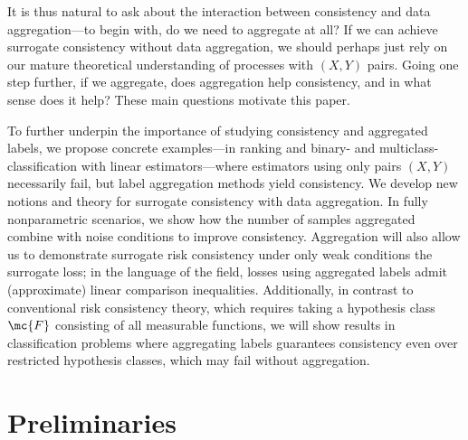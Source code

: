 \documentclass[11pt]{article}
\begin{document}
It is thus natural to ask about the interaction between consistency
and data aggregation---to begin with, do we need to aggregate at all? If we
can achieve surrogate consistency without data aggregation, we should
perhaps just rely on our mature theoretical
understanding of processes with $(X,Y)$ pairs.
%
Going one step further, if we aggregate, does aggregation help
consistency, and in what sense does it help?
%
These main questions motivate this paper.

To further underpin the importance of studying consistency and aggregated
labels, we propose concrete examples---in ranking and binary- and
multiclass-classification with linear estimators---where estimators using
only pairs $(X, Y)$ necessarily fail, but label aggregation methods yield
consistency.
%
We develop new notions and theory for surrogate consistency with data
aggregation.
%
In fully nonparametric scenarios, we show how the
number of samples aggregated combine with noise conditions to
improve consistency.
%
Aggregation will also allow us to demonstrate surrogate risk consistency
under only weak conditions
the surrogate loss;
in the language of the field, losses using aggregated labels
admit (approximate) linear comparison inequalities.
%
Additionally, in contrast to conventional risk consistency theory, which
requires taking a hypothesis class $\mc{F}$ consisting of all measurable
functions, we will show results in classification problems where aggregating
labels guarantees consistency even over restricted hypothesis classes, which
may fail without aggregation.



\section{Preliminaries}
\end{document}
